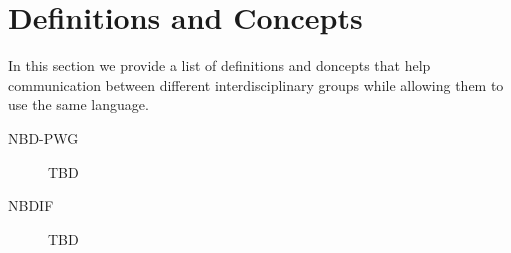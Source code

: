 \section{Definitions and Concepts}
\label{sec:definitions}

In this section we provide a list of definitions and doncepts that
help communication between different interdisciplinary groups while
allowing them to use the same language.

\begin{description}

\item [NBD-PWG] TBD

\item[NBDIF] TBD

\end{description}

